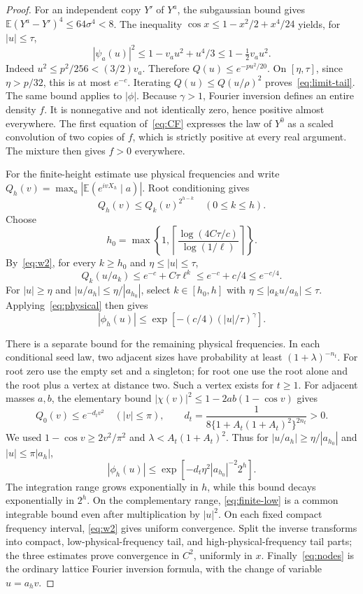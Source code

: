 \documentclass[11pt]{article}
\newcommand{\E}{\mathbb E}
\begin{document}
\begin{proof}
For an independent copy $Y'$ of $Y^a$, the subgaussian bound gives
$\E(Y^a-Y')^4\le64\sigma^4<8$. The inequality
$\cos x\le1-x^2/2+x^4/24$ yields, for $|u|\le\tau$,
\[
 |\psi_a(u)|^2\le1-v_a u^2+u^4/3
 \le1-\tfrac12v_a u^2.
\]
Indeed $u^2\le p^2/256<(3/2)v_a$. Therefore
$Q(u)\le e^{-pu^2/20}$. On $[\eta,\tau]$, since
$\eta>p/32$, this is at most $e^{-c}$. Iterating
$Q(u)\le Q(u/\rho)^2$ proves~\eqref{eq:limit-tail}.
The same bound applies to $|\phi|$.
Because $\gamma>1$, Fourier inversion defines an entire density $f$.
It is nonnegative and not identically zero, hence positive almost
everywhere. The first equation of~\eqref{eq:CF} expresses the law of
$Y^0$ as a scaled convolution of two copies of $f$, which is strictly
positive at every real argument. The mixture then gives $f>0$ everywhere.

For the finite-height estimate use physical frequencies and write
$Q_h(v)=\max_a|\E(e^{ivX_h}\mid a)|$. Root conditioning gives
\begin{equation}\label{eq:physical}
 Q_h(v)\le Q_k(v)^{2^{h-k}}\quad(0\le k\le h).
\end{equation}
Choose
\[
 h_0=\max\left\{1,
 \left\lceil\frac{\log(4C\tau/c)}{\log(1/\ell)}\right\rceil\right\}.
\]
By~\eqref{eq:w2}, for every $k\ge h_0$ and $\eta\le|u|\le\tau$,
\[
 Q_k(u/a_k)\le e^{-c}+C\tau\ell^k\le e^{-c}+c/4\le e^{-c/4}.
\]
For $|u|\ge\eta$ and $|u/a_h|\le\eta/|a_{h_0}|$, select
$k\in[h_0,h]$ with $\eta\le|a_k u/a_h|\le\tau$.
Applying~\eqref{eq:physical} then gives
\begin{equation}\label{eq:finite-low}
 |\phi_h(u)|\le\exp[-(c/4)(|u|/\tau)^\gamma].
\end{equation}

There is a separate bound for the remaining physical frequencies.
In each conditional seed law, two adjacent sizes have probability at
least $(1+\lambda)^{-n_t}$. For root zero use the empty set and a
singleton; for root one use the root alone and the root plus a vertex
at distance two. Such a vertex exists for $t\ge1$.
For adjacent masses $a,b$, the elementary bound
$|\chi(v)|^2\le1-2ab(1-\cos v)$ gives
\[
 Q_0(v)\le e^{-d_t v^2}\quad(|v|\le\pi),\qquad
 d_t=\frac1{8\{1+A_t(1+A_t)^2\}^{2n_t}}>0.
\]
We used $1-\cos v\ge2v^2/\pi^2$ and
$\lambda<A_t(1+A_t)^2$.
Thus for $|u/a_h|\ge\eta/|a_{h_0}|$ and $|u|\le\pi|a_h|$,
\begin{equation}\label{eq:finite-high}
 |\phi_h(u)|\le
 \exp[-d_t\eta^2|a_{h_0}|^{-2}2^h].
\end{equation}
The integration range grows exponentially in $h$, while this bound
decays exponentially in $2^h$. On the complementary range,
\eqref{eq:finite-low} is a common integrable bound even after multiplication
by $|u|^2$. On each fixed compact frequency interval,
\eqref{eq:w2} gives uniform convergence. Split the inverse transforms
into compact, low-physical-frequency tail, and high-physical-frequency
tail parts; the three estimates prove convergence in $C^2$, uniformly
in $x$. Finally~\eqref{eq:nodes} is the ordinary lattice Fourier inversion
formula, with the change of variable $u=a_hv$.
\end{proof}
\end{document}
